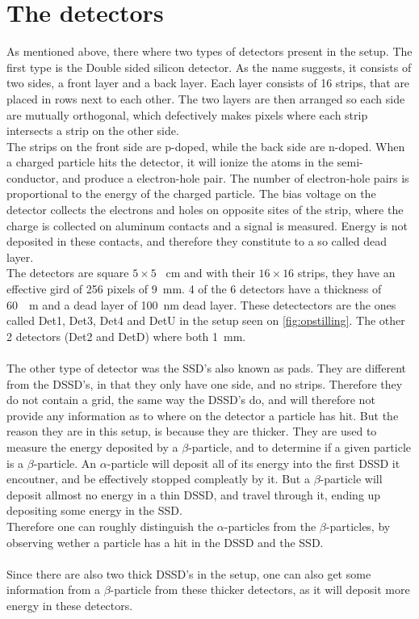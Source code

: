 \section{The detectors}
As mentioned above, there where two types of detectors present in the setup. The first type is the Double sided silicon detector. 
As the name suggests, it consists of two sides, a front layer and a back layer. Each layer consists of 16 strips, that are placed in rows next to each other. The two layers are then arranged so each side are mutually orthogonal, which defectively makes pixels where each strip intersects a strip on the other side. \\
The strips on the front side are p-doped, while the back side are n-doped. When a charged particle hits the detector, it will ionize the atoms in the semi-conductor, and produce a electron-hole pair. The number of electron-hole pairs is proportional to the energy of the charged particle. 
The bias voltage on the detector collects the electrons and holes on opposite sites of the strip, where the charge is collected on aluminum contacts and a signal is measured. Energy is not deposited in these contacts, and therefore they constitute to a so called dead layer. \\
The detectors are square $5\times 5$ \SI{}{cm} and with their $16\times 16$ strips, they have an effective gird of  256 pixels of \SI{9}{mm}. 
4 of the 6 detectors have a thickness of \SI{60}{\mu m} and a dead layer of \SI{100}{nm} dead layer. These detectectors are the ones called Det1, Det3, Det4 and DetU in the setup seen on \cref{fig:opstilling}. The other 2 detectors (Det2 and DetD) where both \SI{1}{mm}.
\\
\\
The other type of detector was the SSD's also known as pads. They are different from the DSSD's, in that they only have one side, and no strips. Therefore they do not contain a grid, the same way the DSSD's do, and will therefore not provide any information as to where on the detector a particle has hit. But the reason they are in this setup, is because they are thicker. They are used to measure the energy deposited by a $\beta$-particle, and to determine if a given particle is a $\beta$-particle. An $\alpha$-particle will deposit all of its energy into the first DSSD it encoutner, and be effectively stopped compleatly by it. But a $\beta$-particle will deposit allmost no energy in a thin DSSD, and travel through it, ending up depositing some energy in the SSD. \\
Therefore one can roughly distinguish the $\alpha$-particles from the $\beta$-particles, by observing wether a particle has a hit in the DSSD and the SSD. \\
\\
Since there are also two thick DSSD's in the setup, one can also get some information from a $\beta$-particle from these thicker detectors, as it will deposit more energy in these detectors. 





